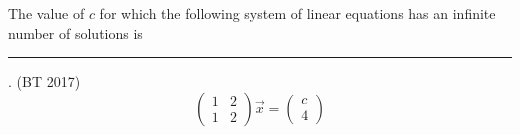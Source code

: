 \item The value of $c$ for which the following system of linear equations has an infinite number of solutions is \rule{1cm}{0.01pt}.
\hfill (BT 2017)
\[
\begin{pmatrix}1 & 2\\ 1 & 2\end{pmatrix}
\vec{x} =
\begin{pmatrix}c\\ 4\end{pmatrix}
\]

